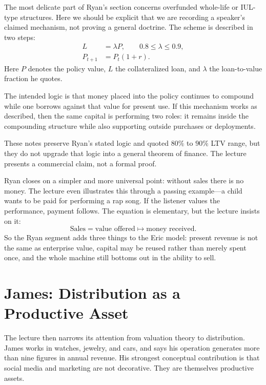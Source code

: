 The most delicate part of Ryan's section concerns overfunded whole-life or IUL-type structures. Here we should be explicit that we are recording a speaker's claimed mechanism, not proving a general doctrine. The scheme is described in two steps:
\begin{align}
L &= \lambda P,\qquad 0.8 \le \lambda \le 0.9,\\
P_{t+1} &= P_t(1+r).
\end{align}
Here \(P\) denotes the policy value, \(L\) the collateralized loan, and \(\lambda\) the loan-to-value fraction he quotes.

The intended logic is that money placed into the policy continues to compound while one borrows against that value for present use. If this mechanism works as described, then the same capital is performing two roles: it remains inside the compounding structure while also supporting outside purchases or deployments.

\begin{remark}
These notes preserve Ryan's stated logic and quoted \(80\%\) to \(90\%\) LTV range, but they do not upgrade that logic into a general theorem of finance. The lecture presents a commercial claim, not a formal proof.
\end{remark}

Ryan closes on a simpler and more universal point: without sales there is no money. The lecture even illustrates this through a passing example---a child wants to be paid for performing a rap song. If the listener values the performance, payment follows. The equation is elementary, but the lecture insists on it:
\begin{equation}
\text{Sales} = \text{value offered} \mapsto \text{money received}.
\end{equation}
So the Ryan segment adds three things to the Eric model: present revenue is not the same as enterprise value, capital may be reused rather than merely spent once, and the whole machine still bottoms out in the ability to sell.

\section{James: Distribution as a Productive Asset}

The lecture then narrows its attention from valuation theory to distribution. James works in watches, jewelry, and cars, and says his operation generates more than nine figures in annual revenue. His strongest conceptual contribution is that social media and marketing are not decorative. They are themselves productive assets.

